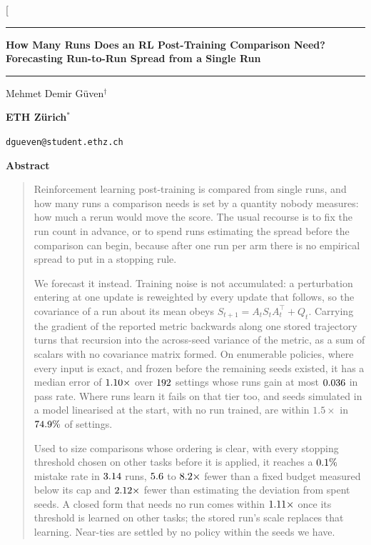 \documentclass[10pt,twocolumn]{article}
\theoremstyle{definition}
\newcommand{\ruledtitle}[1]{%
  \par\noindent\rule{\textwidth}{1.6pt}\par\vspace{3pt}
  {\centering\fontsize{15}{17}\selectfont\bfseries #1\par}
  \vspace{3pt}\noindent\rule{\textwidth}{0.4pt}\par
}
\begin{document}
\twocolumn[
  \ruledtitle{How Many Runs Does an RL Post-Training Comparison Need?\\
  Forecasting Run-to-Run Spread from a Single Run}
  \vspace{6pt}
  {\centering
    \normalsize Mehmet Demir G\"uven$^{\dagger}$\par\vspace{2pt}
    \normalsize\textbf{ETH Z\"urich}$^{*}$\par\vspace{1pt}
    \small\texttt{dgueven@student.ethz.ch}\par
  }
  \vspace{6pt}
  \begin{minipage}{\textwidth}
  \begin{center}\textbf{Abstract}\end{center}
  \vspace{-4pt}
  \begin{quote}
  Reinforcement learning post-training is compared from single runs, and how many runs a
  comparison needs is set by a quantity nobody measures: how much a rerun would move the score.
  The usual recourse is to fix the run count in advance, or to spend runs estimating the spread
  before the comparison can begin, because after one run per arm there is no empirical spread to
  put in a stopping rule.

  We forecast it instead. Training noise is not accumulated: a perturbation entering at one update
  is reweighted by every update that follows, so the covariance of a run about its mean obeys
  $S_{t+1} = A_t S_t A_t^{\!\top} + Q_t$. Carrying the gradient of the reported metric backwards
  along one stored trajectory turns that recursion into the across-seed variance of the metric, as
  a sum of scalars with no covariance matrix formed. On enumerable policies, where every input is
  exact, and frozen before the remaining seeds existed, it has a median error of
  $1.10\times$ over $192$ settings whose runs gain at most
  $0.036$ in pass rate. Where runs learn it fails on that tier too, and seeds
  simulated in a model linearised at the start, with no run trained, are within $1.5\times$ in
  $74.9\%$ of settings.

  Used to size comparisons whose ordering is clear, with every stopping threshold chosen on other
  tasks before it is applied, it reaches a $0.1\%$ mistake rate in
  $3.14$ runs, $5.6$ to $8.2\times$ fewer
  than a fixed budget measured below its cap and $2.12\times$ fewer than
  estimating the deviation from spent seeds. A closed form that needs no run comes within
  $1.11\times$ once its threshold is learned on other tasks; the stored run's
  scale replaces that learning. Near-ties are settled by no policy within the seeds we have.


\end{quote}
\end{minipage}
\end{document}
